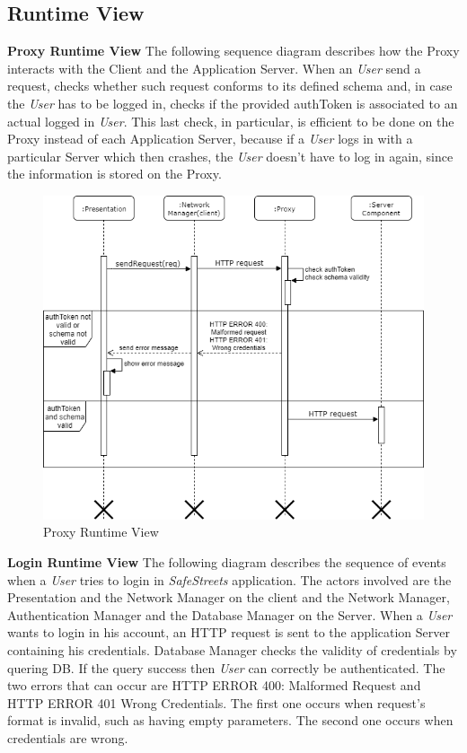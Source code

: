 \documentclass{article}
\begin{document}
\clearpage

\subsection{Runtime View}
\textbf{Proxy Runtime View}
The following sequence diagram describes how the Proxy interacts with the Client and the Application 
Server. When an \textit{User} send a request, checks whether such request conforms to its defined schema and, 
in case the \textit{User} has to be logged in, checks if the provided authToken is associated to an actual 
logged in \textit{User}. This last check, in particular, is efficient to be done on the Proxy instead of each 
Application Server, because if a \textit{User} logs in with a particular Server which then crashes, the 
\textit{User} doesn't have to log in again, since the information is stored on the Proxy. 

\begin{figure}[H]
    \centering
    \includegraphics[scale=0.4]{img/sequence_diagrams/Proxy_sequence.png}
    \caption{Proxy Runtime View}
\end{figure}  


\textbf{Login Runtime View}
The following diagram describes the sequence of events when a \textit{User} tries to login in 
\textit{SafeStreets} application. The actors involved are the Presentation and the Network Manager on the
client and the Network Manager, Authentication Manager and the Database Manager on the Server.
When a \textit{User} wants to login in his account, an HTTP request is sent to the application Server
containing his credentials. Database Manager checks the validity of credentials by quering DB. If the query
success then \textit{User} can correctly be authenticated. The two errors that can occur are HTTP ERROR 400:
Malformed Request and HTTP ERROR 401 Wrong Credentials. The first one occurs when request's format is invalid,
such as having empty parameters. The second one occurs when credentials are wrong.   
\end{document}
